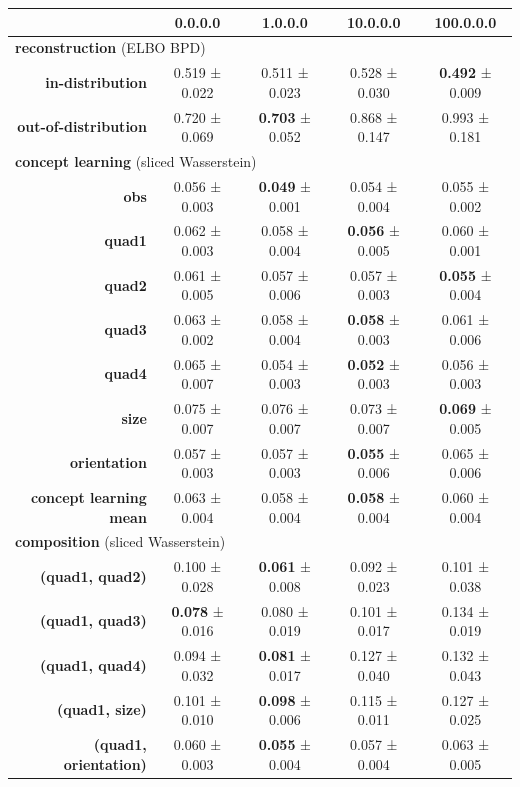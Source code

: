 \begin{tabular}{rcccc}
\toprule
& \textbf{0.0.0.0} & \textbf{1.0.0.0} & \textbf{10.0.0.0} & \textbf{100.0.0.0} \\
\midrule
\multicolumn{ 5 }{l}{\textbf{reconstruction}  (ELBO BPD)} \\
\midrule
\textbf{in-distribution} & 0.519 ± 0.022 & 0.511 ± 0.023 & 0.528 ± 0.030 & \textbf{0.492} ± 0.009 \\
\textbf{out-of-distribution} & 0.720 ± 0.069 & \textbf{0.703} ± 0.052 & 0.868 ± 0.147 & 0.993 ± 0.181 \\
\midrule
\multicolumn{ 5 }{l}{\textbf{concept learning}  (sliced Wasserstein)} \\
\midrule
\textbf{obs} & 0.056 ± 0.003 & \textbf{0.049} ± 0.001 & 0.054 ± 0.004 & 0.055 ± 0.002 \\
\textbf{quad1} & 0.062 ± 0.003 & 0.058 ± 0.004 & \textbf{0.056} ± 0.005 & 0.060 ± 0.001 \\
\textbf{quad2} & 0.061 ± 0.005 & 0.057 ± 0.006 & 0.057 ± 0.003 & \textbf{0.055} ± 0.004 \\
\textbf{quad3} & 0.063 ± 0.002 & 0.058 ± 0.004 & \textbf{0.058} ± 0.003 & 0.061 ± 0.006 \\
\textbf{quad4} & 0.065 ± 0.007 & 0.054 ± 0.003 & \textbf{0.052} ± 0.003 & 0.056 ± 0.003 \\
\textbf{size} & 0.075 ± 0.007 & 0.076 ± 0.007 & 0.073 ± 0.007 & \textbf{0.069} ± 0.005 \\
\textbf{orientation} & 0.057 ± 0.003 & 0.057 ± 0.003 & \textbf{0.055} ± 0.006 & 0.065 ± 0.006 \\
\addlinespace
\textbf{concept learning mean} & 0.063 ± 0.004 & 0.058 ± 0.004 & \textbf{0.058} ± 0.004 & 0.060 ± 0.004 \\
\midrule
\multicolumn{ 5 }{l}{\textbf{composition}  (sliced Wasserstein)} \\
\midrule
\textbf{(quad1, quad2)} & 0.100 ± 0.028 & \textbf{0.061} ± 0.008 & 0.092 ± 0.023 & 0.101 ± 0.038 \\
\textbf{(quad1, quad3)} & \textbf{0.078} ± 0.016 & 0.080 ± 0.019 & 0.101 ± 0.017 & 0.134 ± 0.019 \\
\textbf{(quad1, quad4)} & 0.094 ± 0.032 & \textbf{0.081} ± 0.017 & 0.127 ± 0.040 & 0.132 ± 0.043 \\
\textbf{(quad1, size)} & 0.101 ± 0.010 & \textbf{0.098} ± 0.006 & 0.115 ± 0.011 & 0.127 ± 0.025 \\
\textbf{(quad1, orientation)} & 0.060 ± 0.003 & \textbf{0.055} ± 0.004 & 0.057 ± 0.004 & 0.063 ± 0.005 \\

\end{tabular}
